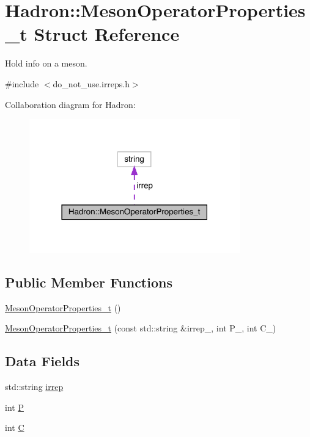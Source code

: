 \hypertarget{structHadron_1_1MesonOperatorProperties__t}{}\section{Hadron\+:\+:Meson\+Operator\+Properties\+\_\+t Struct Reference}
\label{structHadron_1_1MesonOperatorProperties__t}


Hold info on a meson.  




{\ttfamily \#include $<$do\+\_\+not\+\_\+use.\+irreps.\+h$>$}



Collaboration diagram for Hadron\+:\nopagebreak
\begin{figure}[H]
\begin{center}
\leavevmode
\includegraphics[width=258pt]{df/d4d/structHadron_1_1MesonOperatorProperties__t__coll__graph}
\end{center}
\end{figure}
\subsection*{Public Member Functions}
\begin{DoxyCompactItemize}
\item 
\mbox{\hyperlink{structHadron_1_1MesonOperatorProperties__t_aa487d0682fa07b3cf7f81dae4575cdd4}{Meson\+Operator\+Properties\+\_\+t}} ()
\item 
\mbox{\hyperlink{structHadron_1_1MesonOperatorProperties__t_a28d5b4aa6225854a98bc838c9c9872ea}{Meson\+Operator\+Properties\+\_\+t}} (const std\+::string \&irrep\+\_\+, int P\+\_\+, int C\+\_\+)
\end{DoxyCompactItemize}
\subsection*{Data Fields}
\begin{DoxyCompactItemize}
\item 
std\+::string \mbox{\hyperlink{structHadron_1_1MesonOperatorProperties__t_a70e362a662368b771e11a3dd4bfdac7d}{irrep}}
\item 
int \mbox{\hyperlink{structHadron_1_1MesonOperatorProperties__t_a98618ec3eaa711794139ab44404db273}{P}}
\item 
int \mbox{\hyperlink{structHadron_1_1MesonOperatorProperties__t_a0aa883e94ef86b6f7f294e6e330d1ddc}{C}}
\end{DoxyCompactItemize}


